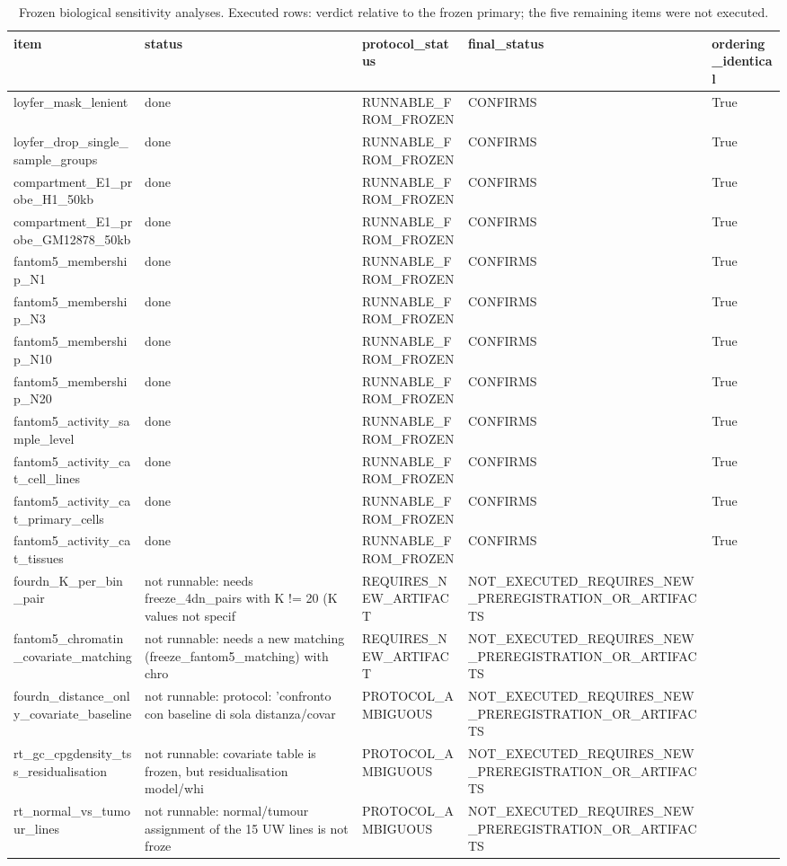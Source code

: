 \begin{table}[t]
\centering
\small
\begin{tabular}{lllll}
\toprule
item & status & protocol\_status & final\_status & ordering\_identical \\
\midrule
loyfer\_mask\_lenient & done & RUNNABLE\_FROM\_FROZEN & CONFIRMS & True \\
loyfer\_drop\_single\_sample\_groups & done & RUNNABLE\_FROM\_FROZEN & CONFIRMS & True \\
compartment\_E1\_probe\_H1\_50kb & done & RUNNABLE\_FROM\_FROZEN & CONFIRMS & True \\
compartment\_E1\_probe\_GM12878\_50kb & done & RUNNABLE\_FROM\_FROZEN & CONFIRMS & True \\
fantom5\_membership\_N1 & done & RUNNABLE\_FROM\_FROZEN & CONFIRMS & True \\
fantom5\_membership\_N3 & done & RUNNABLE\_FROM\_FROZEN & CONFIRMS & True \\
fantom5\_membership\_N10 & done & RUNNABLE\_FROM\_FROZEN & CONFIRMS & True \\
fantom5\_membership\_N20 & done & RUNNABLE\_FROM\_FROZEN & CONFIRMS & True \\
fantom5\_activity\_sample\_level & done & RUNNABLE\_FROM\_FROZEN & CONFIRMS & True \\
fantom5\_activity\_cat\_cell\_lines & done & RUNNABLE\_FROM\_FROZEN & CONFIRMS & True \\
fantom5\_activity\_cat\_primary\_cells & done & RUNNABLE\_FROM\_FROZEN & CONFIRMS & True \\
fantom5\_activity\_cat\_tissues & done & RUNNABLE\_FROM\_FROZEN & CONFIRMS & True \\
fourdn\_K\_per\_bin\_pair & not runnable: needs freeze\_4dn\_pairs with K != 20 (K values not specif & REQUIRES\_NEW\_ARTIFACT & NOT\_EXECUTED\_REQUIRES\_NEW\_PREREGISTRATION\_OR\_ARTIFACTS &  \\
fantom5\_chromatin\_covariate\_matching & not runnable: needs a new matching (freeze\_fantom5\_matching) with chro & REQUIRES\_NEW\_ARTIFACT & NOT\_EXECUTED\_REQUIRES\_NEW\_PREREGISTRATION\_OR\_ARTIFACTS &  \\
fourdn\_distance\_only\_covariate\_baseline & not runnable: protocol: 'confronto con baseline di sola distanza/covar & PROTOCOL\_AMBIGUOUS & NOT\_EXECUTED\_REQUIRES\_NEW\_PREREGISTRATION\_OR\_ARTIFACTS &  \\
rt\_gc\_cpgdensity\_tss\_residualisation & not runnable: covariate table is frozen, but residualisation model/whi & PROTOCOL\_AMBIGUOUS & NOT\_EXECUTED\_REQUIRES\_NEW\_PREREGISTRATION\_OR\_ARTIFACTS &  \\
rt\_normal\_vs\_tumour\_lines & not runnable: normal/tumour assignment of the 15 UW lines is not froze & PROTOCOL\_AMBIGUOUS & NOT\_EXECUTED\_REQUIRES\_NEW\_PREREGISTRATION\_OR\_ARTIFACTS &  \\
\bottomrule
\end{tabular}
\caption{Frozen biological sensitivity analyses. Executed rows: verdict relative to the frozen primary; the five remaining items were not executed.}
\label{tab:s13}
\end{table}

